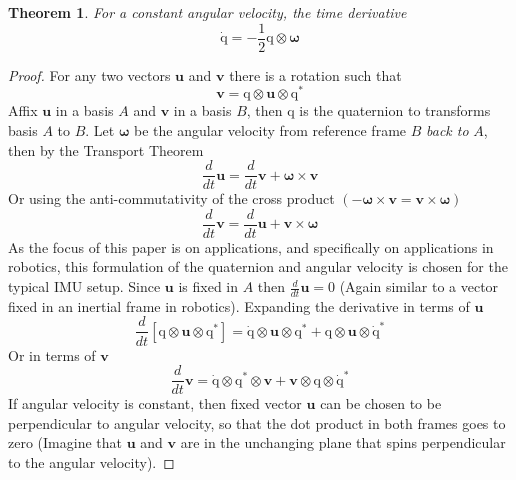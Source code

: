 \documentclass{amsart}
\newtheorem{theorem}{Theorem}[section]
\theoremstyle{definition}
\theoremstyle{remark}
\numberwithin{equation}{section}
\begin{document}
\begin{theorem}
  For a constant angular velocity, the time derivative 
  \begin{equation}
    \mathrm{\dot{q}} = -\frac{1}{2} \mathrm{q} \otimes \boldsymbol\omega
  \end{equation}
\end{theorem}
\begin{proof}
  For any two vectors $\mathbf{u}$ and $\mathbf{v}$ there is a rotation such that
	\begin{equation}
		\mathbf{v} = \mathrm{q} \otimes \mathbf{u} \otimes \mathrm{q}^*
	\end{equation}
	Affix $\mathbf{u}$ in a basis $A$ and $\mathbf{v}$ in a basis $B$, then $\mathrm{q}$ is the quaternion to transforms basis $A$ to $B$.
	Let $\boldsymbol\omega$ be the angular velocity from reference frame $B$ \emph{back to} $A$, then by the Transport Theorem
  \begin{equation}
    \frac{d}{dt} \mathbf{u} = \frac{d}{dt} \mathbf{v} + \boldsymbol\omega \times \mathbf{v}
  \end{equation}
	Or using the anti-commutativity of the cross product $(-\boldsymbol\omega\times\mathbf{v}=\mathbf{v}\times\boldsymbol\omega)$
	\begin{equation}
		\frac{d}{dt}\mathbf{v} = \frac{d}{dt} \mathbf{u} + \mathbf{v}\times\boldsymbol\omega
	\end{equation}
	As the focus of this paper is on applications, and specifically on applications in robotics, this formulation of the quaternion and angular velocity is chosen for the typical IMU setup. 
  Since $\mathbf{u}$ is fixed in $A$ then $\frac{d}{dt}\mathbf{u}=0$ (Again similar to a vector fixed in an inertial frame in robotics). Expanding the derivative in terms of $\mathbf{u}$
	\begin{equation}
		\frac{d}{dt}\left[\mathrm{q}\otimes\mathbf{u}\otimes\mathrm{q^*}\right] = \mathrm{\dot{q}}\otimes \mathbf{u} \otimes \mathrm{q^*} + \mathrm{q} \otimes \mathbf{u} \otimes \mathrm{\dot{q}}^* 
	\end{equation}
	Or in terms of $\mathbf{v}$
	\begin{equation}
		\frac{d}{dt} \mathbf{v} = \mathrm{\dot{q}} \otimes \mathrm{q}^* \otimes \mathbf{v} +
		\mathbf{v}\otimes\mathrm{q}\otimes\mathrm{\dot{q}^*}
	\end{equation}
	If angular velocity is constant, then fixed vector $\mathbf{u}$ can be chosen to be perpendicular to angular velocity, so that the dot product in both frames goes to zero (Imagine that $\mathbf{u}$ and $\mathbf{v}$ are in the unchanging plane that spins perpendicular to the angular velocity).

\end{proof}
\end{document}

